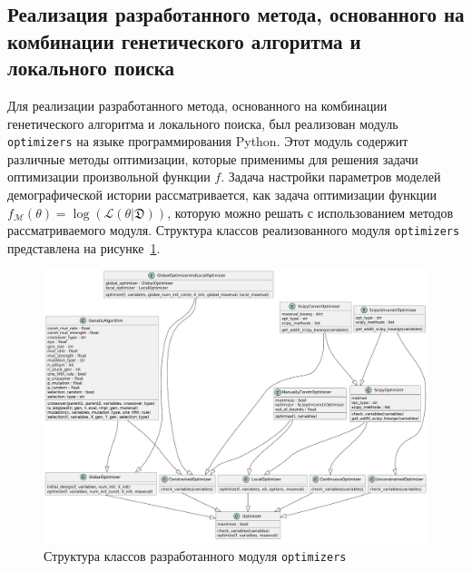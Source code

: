 \FloatBarrier
\subsection{Реализация разработанного метода, основанного на комбинации генетического алгоритма и локального поиска}
\label{sec:part2:genetic_algorithm:implementation}

Для реализации разработанного метода, основанного на комбинации генетического алгоритма и локального поиска, был реализован модуль \texttt{optimizers} на языке программирования Python.
Этот модуль содержит различные методы оптимизации, которые применимы для решения задачи оптимизации произвольной функции $f$.
Задача настройки параметров моделей демографической истории рассматривается, как задача оптимизации функции $f_\mathcal{M}(\theta) = \log(\mathcal{L}(\theta | \mathfrak{D}))$, которую можно решать с использованием методов рассматриваемого модуля.
Структура классов реализованного модуля \texttt{optimizers} представлена на рисунке~\ref{fig:part2:optimizers_classes}.

\begin{figure}[ht]
    \centering
    \includegraphics[width=\linewidth]{images/part5/optimizer_classes_short_wo_bo.pdf}
    \caption{Структура классов разработанного модуля \texttt{optimizers}}
    \label{fig:part2:optimizers_classes}
\end{figure}

